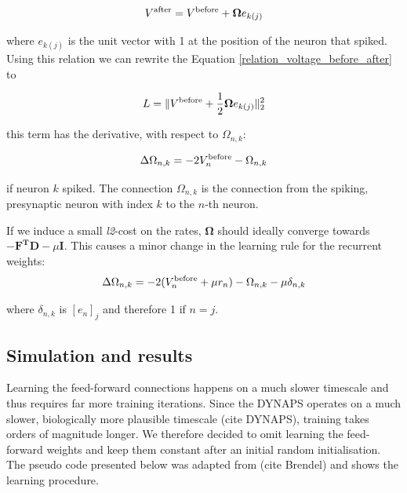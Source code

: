\documentclass[twoside,11pt]{article}
\begin{document}
\begin{equation} \label{relation_voltage_before_after}
  V^{\textnormal{after}} = V^{\textnormal{before}} + \mathbf{\Omega} e_{k(j)}
\end{equation}

where $e_{k(j)}$ is the unit vector with 1 at the position of the neuron that spiked.
Using this relation we can rewrite the Equation \ref{relation_voltage_before_after} to

\begin{equation*} 
  L = \|V^{\textnormal{before}} + \frac{1}{2}\mathbf{\Omega} e_{k(j)}\|^2_2
\end{equation*}

this term has the derivative, with respect to $\Omega_{n,k}$:

\begin{equation}
    \Delta \Omega_{n,k} = -2V^{\textnormal{before}}_n - \Omega_{n,k}
\end{equation}

if neuron $k$ spiked. The connection $\Omega_{n,k}$ is the connection from the spiking, presynaptic neuron with index $k$ to the $n$-th neuron.

If we induce a small \textit{l2}-cost on the rates, $\mathbf{\Omega}$ should ideally converge towards $-\mathbf{F^TD} - \mu \mathbf{I}$. This causes a minor change in the learning rule for the recurrent weights:
\begin{equation} \label{updated_recurrent_learning_rule}
    \Delta \Omega_{n,k} = -2(V^{\textnormal{before}}_n + \mu r_n) - \Omega_{n,k} - \mu \delta_{n,k}
\end{equation}

where $\delta_{n,k}$ is $[e_n]_j$ and therefore 1 if $n =j$.


\subsection{Simulation and results}
Learning the feed-forward connections happens on a much slower timescale and thus requires
far more training iterations. Since the DYNAPS operates on a much slower, biologically
more plausible timescale (cite DYNAPS), training takes orders of magnitude longer. We therefore decided to omit
learning the feed-forward weights and keep them constant after an initial random initialisation.
The pseudo code presented below was adapted from (cite Brendel) and shows the learning procedure.
\end{document}
